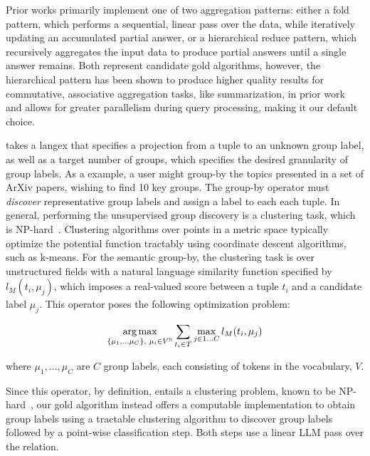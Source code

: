 Prior works primarily implement one of two aggregation patterns: either a fold pattern, which performs a sequential, linear pass over the data, while iteratively updating an accumulated partial answer, or a hierarchical reduce pattern, which recursively aggregates the input data to produce partial answers until a single answer remains. 
Both represent candidate gold algorithms, however, the hierarchical pattern has been shown to produce higher quality results for commutative, associative aggregation tasks, like summarization, in prior work~\cite{chang_booookscore_2024} and allows for greater parallelism during query processing, making it our default choice.





 takes a langex that specifies a projection from a tuple to an unknown group label, as well as a target number of groups, which specifies the desired granularity of group labels. As a example, a user might group-by the topics presented in a set of ArXiv papers, wishing to find 10 key groups. The group-by operator must \emph{discover} representative group labels and assign a label to each each tuple. In general, performing the unsupervised group discovery is a clustering task, which is NP-hard~\cite{dasgupta_hardness_nodate}. Clustering algorithms over points in a metric space typically optimize the potential function tractably using coordinate descent algorithms, such as k-means. For the semantic group-by, the clustering task is over unstructured fields with a natural language similarity function specified by $l_M(t_i, \mu_j)$, which imposes a real-valued score between a tuple $t_i$ and a candidate label $\mu_j$. This operator poses the following optimization problem: 

$$\operatorname*{arg\,max}_{\{\mu_1, ...\mu_C\},\textit{\space}\mu_i \in V^\mathbb{N}} \sum_{t_i\in T} \max_{j\in 1\ldots C} l_{M}(t_i, \mu_j)$$

\noindent where $\mu_1, ..., \mu_C$ are $C$ group labels, each consisting of tokens in the vocabulary, $V$. 


Since this operator, by definition, entails a clustering problem, known to be NP-hard~\cite{dasgupta_hardness_nodate}, our gold algorithm instead offers a computable implementation to obtain group labels using a tractable clustering algorithm to discover group labels followed by a point-wise classification step. Both steps use a linear LLM pass over the relation. 

